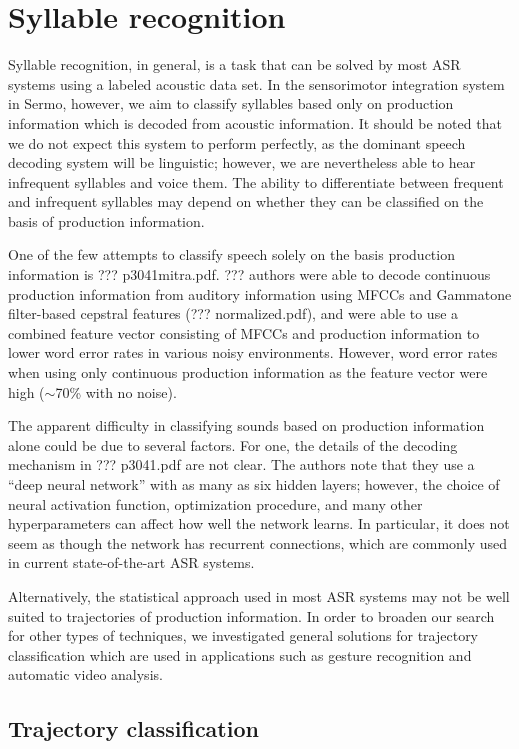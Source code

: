 \section{Syllable recognition}

Syllable recognition, in general,
is a task that can be solved
by most ASR systems
using a labeled acoustic data set.
In the sensorimotor integration system
in Sermo, however,
we aim to classify syllables
based only on production information
which is decoded from acoustic information.
It should be noted that we do not expect
this system to perform perfectly,
as the dominant speech decoding system
will be linguistic;
however, we are nevertheless able
to hear infrequent syllables
and voice them.
The ability to differentiate
between frequent and infrequent syllables
may depend on whether they
can be classified
on the basis of production information.

One of the few attempts to classify speech
solely on the basis production information
is ??? p3041mitra.pdf.
??? authors were able to
decode continuous production information
from auditory information
using MFCCs and Gammatone filter-based
cepstral features (??? normalized.pdf),
and were able to use a combined feature vector
consisting of MFCCs and production information
to lower word error rates
in various noisy environments.
However, word error rates
when using only continuous production information
as the feature vector
were high ($\sim$70\% with no noise).

The apparent difficulty
in classifying sounds based on
production information alone
could be due to several factors.
For one, the details of the decoding mechanism
in ??? p3041.pdf are not clear.
The authors note that they use a
``deep neural network''
with as many as six hidden layers;
however, the choice of neural activation function,
optimization procedure,
and many other hyperparameters
can affect how well the network learns.
In particular, it does not seem as though
the network has recurrent connections,
which are commonly used in
current state-of-the-art ASR systems.

Alternatively, the statistical approach
used in most ASR systems
may not be well suited to
trajectories of production information.
In order to broaden our search
for other types of techniques,
we investigated general solutions
for trajectory classification
which are used in applications
such as gesture recognition
and automatic video analysis.

\subsection{Trajectory classification}

